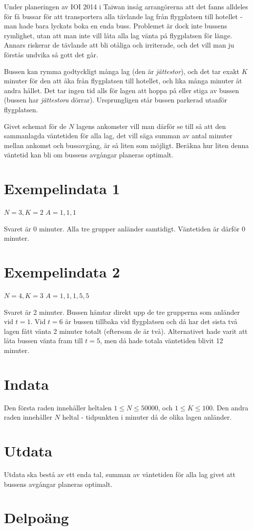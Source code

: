 
Under planeringen av IOI 2014 i Taiwan insåg arrangörerna att det fanns alldeles för få bussar för att transportera alla tävlande lag från flygplatsen till hotellet - man hade bara lyckats boka en enda buss. Problemet är dock inte bussens rymlighet, utan att man inte vill låta alla lag vänta på flygplatsen för länge. Annars riskerar de tävlande att bli otåliga och irriterade, och det vill man ju förstås undvika så gott det går.

Bussen kan rymma godtyckligt många lag (den är \emph{jättestor}), och det tar exakt $K$ minuter för den att åka från flygplatsen till hotellet, och lika många minuter åt andra hållet. Det tar ingen tid alls för lagen att hoppa på eller stiga av bussen (bussen har \emph{jättestora} dörrar). Ursprungligen står bussen parkerad utanför flygplatsen.

Givet schemat för de $N$ lagens ankomster vill man därför se till så att den sammanlagda väntetiden för alla lag, det vill säga summan av antal minuter mellan ankomst och bussavgång, är så liten som möjligt. Beräkna hur liten denna väntetid kan bli om bussens avgångar planeras optimalt.

\section*{Exempelindata 1}
$N = 3, K = 2$
$A = {1, 1, 1}$

Svaret är 0 minuter. Alla tre grupper anländer samtidigt. Väntetiden är därför 0 minuter.

\section*{Exempelindata 2}
$N = 4, K = 3$
$A = {1, 1, 1, 5, 5}$

Svaret är 2 minuter. Bussen hämtar direkt upp de tre grupperna som anländer vid $t = 1$. Vid $t = 6$ är bussen tillbaka vid flygplatsen och då har det sista två lagen fått vänta 2 minuter totalt (eftersom de är två). Alternativet hade varit att låta bussen vänta fram till $t = 5$, men då hade totala väntetiden blivit 12 minuter.

\section*{Indata}
Den första raden innehåller heltalen $1 \leq N \leq 50 000$, och $1 \leq K \leq 100$.
Den andra raden innehåller $N$ heltal - tidpunkten i minuter då de olika lagen anländer.

\section*{Utdata}
Utdata ska bestå av ett enda tal, summan av väntetiden för alla lag givet att bussens avgångar planeras optimalt.

\section*{Delpoäng}

